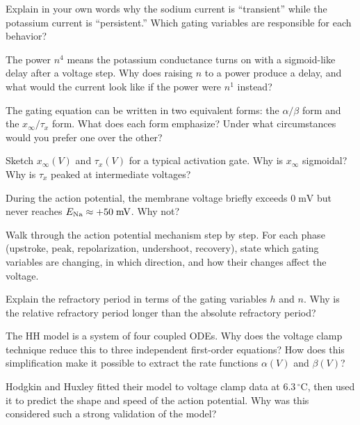 \begin{conceptquestions}
  \item Explain in your own words why the sodium current is ``transient'' while the potassium current is ``persistent.'' Which gating variables are responsible for each behavior?

  \item The power $n^4$ means the potassium conductance turns on with a sigmoid-like delay after a voltage step. Why does raising $n$ to a power produce a delay, and what would the current look like if the power were $n^1$ instead?

  \item The gating equation can be written in two equivalent forms: the $\alpha/\beta$ form and the $x_\infty/\tau_x$ form. What does each form emphasize? Under what circumstances would you prefer one over the other?

  \item Sketch $x_\infty(V)$ and $\tau_x(V)$ for a typical activation gate. Why is $x_\infty$ sigmoidal? Why is $\tau_x$ peaked at intermediate voltages?

  \item During the action potential, the membrane voltage briefly exceeds $0\;\text{mV}$ but never reaches $E_{\mathrm{Na}} \approx +50\;\text{mV}$. Why not?

  \item Walk through the action potential mechanism step by step. For each phase (upstroke, peak, repolarization, undershoot, recovery), state which gating variables are changing, in which direction, and how their changes affect the voltage.

  \item Explain the refractory period in terms of the gating variables $h$ and $n$. Why is the relative refractory period longer than the absolute refractory period?

  \item The HH model is a system of four coupled ODEs. Why does the voltage clamp technique reduce this to three independent first-order equations? How does this simplification make it possible to extract the rate functions $\alpha(V)$ and $\beta(V)$?

  \item Hodgkin and Huxley fitted their model to voltage clamp data at $6.3\,^\circ\text{C}$, then used it to predict the shape and speed of the action potential. Why was this considered such a strong validation of the model?


\end{conceptquestions}
